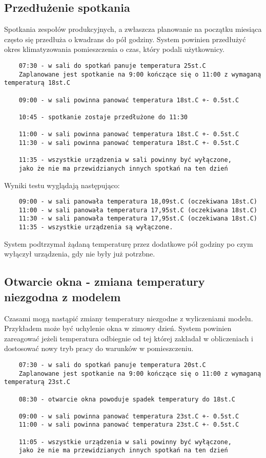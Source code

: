 \subsection{Przedłużenie spotkania}
Spotkania zespołów produkcyjnych, a zwłaszcza planowanie na początku miesiąca często się przedłuża o kwadrans do pół godziny. System powinien przedłużyć okres klimatyzowania pomieszczenia o czas, który podali użytkownicy.
\begin{lstlisting}
    07:30 - w sali do spotkań panuje temperatura 25st.C
    Zaplanowane jest spotkanie na 9:00 kończące się o 11:00 z wymaganą temperaturą 18st.C
            
    09:00 - w sali powinna panować temperatura 18st.C +- 0.5st.C
    
    10:45 - spotkanie zostaje przedłużone do 11:30
    
    11:00 - w sali powinna panować temperatura 18st.C +- 0.5st.C
    11:30 - w sali powinna panować temperatura 18st.C +- 0.5st.C

    11:35 - wszystkie urządzenia w sali powinny być wyłączone, 
    jako że nie ma przewidzianych innych spotkań na ten dzień
\end{lstlisting}

Wyniki testu wyglądają następująco:
\begin{lstlisting}
    09:00 - w sali panowała temperatura 18,09st.C (oczekiwana 18st.C)
    11:00 - w sali panowała temperatura 17,95st.C (oczekiwana 18st.C)
    11:30 - w sali panowała temperatura 17,95st.C (oczekiwana 18st.C)
    11:35 - wszystkie urządzenia są wyłączone.
\end{lstlisting}
System podtrzymał żądaną temperaturę przez dodatkowe pół godziny po czym wyłączył urządzenia, gdy nie były już potrzbne.

\subsection{Otwarcie okna - zmiana temperatury niezgodna z modelem}
Czasami mogą nastąpić zmiany temperatury niezgodne z wyliczeniami modelu. Przykładem może być uchylenie okna w zimowy dzień. System powinien zareagować jeżeli temperatura odbiegnie od tej której zakładał w obliczeniach i dostosować nowy tryb pracy do warunków w pomieszczeniu.

\begin{lstlisting}
    07:30 - w sali do spotkań panuje temperatura 20st.C
    Zaplanowane jest spotkanie na 9:00 kończące się o 11:00 z wymaganą temperaturą 23st.C

    08:30 - otwarcie okna powoduje spadek temperatury do 18st.C 
    
    09:00 - w sali powinna panować temperatura 23st.C +- 0.5st.C
    11:00 - w sali powinna panować temperatura 23st.C +- 0.5st.C
    
    11:05 - wszystkie urządzenia w sali powinny być wyłączone, 
    jako że nie ma przewidzianych innych spotkań na ten dzień
\end{lstlisting}

